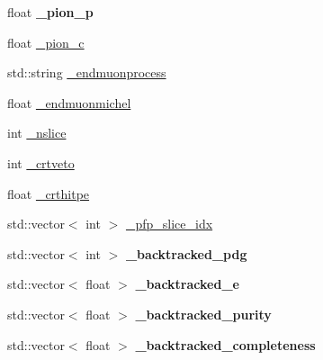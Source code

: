 \begin{DoxyCompactItemize}
\item 
float {\bfseries \+\_\+pion\+\_\+p}\hypertarget{classanalysis_1_1DefaultAnalysis_ab00137bb368e7d1e41814047aeb4a430}{}\label{classanalysis_1_1DefaultAnalysis_ab00137bb368e7d1e41814047aeb4a430}

\item 
float \hyperlink{classanalysis_1_1DefaultAnalysis_a9978effbcfba62536fc88a73fa985fe9}{\+\_\+pion\+\_\+c}
\item 
std\+::string \hyperlink{classanalysis_1_1DefaultAnalysis_a8cbb24a231e167258d2914f92bc4af22}{\+\_\+endmuonprocess}
\item 
float \hyperlink{classanalysis_1_1DefaultAnalysis_a3797bcb310074825add03ce03175fdc3}{\+\_\+endmuonmichel}
\item 
int \hyperlink{classanalysis_1_1DefaultAnalysis_a3eddf49910782afed7f324755fffe681}{\+\_\+nslice}
\item 
int \hyperlink{classanalysis_1_1DefaultAnalysis_a84ce9904fa527012a65c2be203a38d38}{\+\_\+crtveto}
\item 
float \hyperlink{classanalysis_1_1DefaultAnalysis_a900ec35e3ca4a00d4625a1e632bb6b40}{\+\_\+crthitpe}
\item 
std\+::vector$<$ int $>$ \hyperlink{classanalysis_1_1DefaultAnalysis_acbf0c279993cbefca72f38bc5e9f6627}{\+\_\+pfp\+\_\+slice\+\_\+idx}
\item 
std\+::vector$<$ int $>$ {\bfseries \+\_\+backtracked\+\_\+pdg}\hypertarget{classanalysis_1_1DefaultAnalysis_a28bd59dce75b8fd3be70bd4996354ae9}{}\label{classanalysis_1_1DefaultAnalysis_a28bd59dce75b8fd3be70bd4996354ae9}

\item 
std\+::vector$<$ float $>$ {\bfseries \+\_\+backtracked\+\_\+e}\hypertarget{classanalysis_1_1DefaultAnalysis_a2c16b4988d0bccf8b7ef96a52c173b80}{}\label{classanalysis_1_1DefaultAnalysis_a2c16b4988d0bccf8b7ef96a52c173b80}

\item 
std\+::vector$<$ float $>$ {\bfseries \+\_\+backtracked\+\_\+purity}\hypertarget{classanalysis_1_1DefaultAnalysis_ad08d9b30c434685e350c5f292d4df08b}{}\label{classanalysis_1_1DefaultAnalysis_ad08d9b30c434685e350c5f292d4df08b}

\item 
std\+::vector$<$ float $>$ {\bfseries \+\_\+backtracked\+\_\+completeness}\hypertarget{classanalysis_1_1DefaultAnalysis_a60ef3ec6e332c118c088e0203fb858d6}{}\label{classanalysis_1_1DefaultAnalysis_a60ef3ec6e332c118c088e0203fb858d6}


\end{DoxyCompactItemize}
